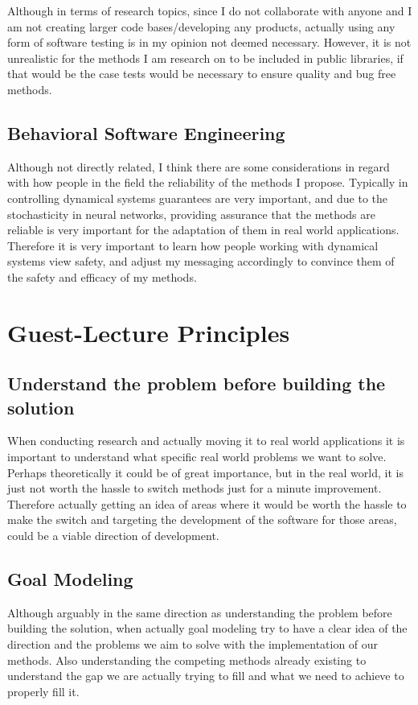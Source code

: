 \documentclass{article}
\begin{document}
Although in terms of research topics, since I do not collaborate with anyone and I am not creating larger code bases/developing any products, actually using any form of software testing is in my opinion not deemed necessary. However, it is not unrealistic for the methods I am research on to be included in public libraries, if that would be the case tests would be necessary to ensure quality and bug free methods.

\subsection{Behavioral Software Engineering}
Although not directly related, I think there are some considerations in regard with how people in the field the reliability of the methods I propose. Typically in controlling dynamical systems guarantees are very important, and due to the stochasticity in neural networks, providing assurance that the methods are reliable is very important for the adaptation of them in real world applications. Therefore it is very important to learn how people working with dynamical systems view safety, and adjust my messaging accordingly to convince them of the safety and efficacy of my methods.

\section{Guest-Lecture Principles}
\subsection{Understand the problem before building the solution}
When conducting research and actually moving it to real world applications it is important to understand what specific real world problems we want to solve. Perhaps theoretically it could be of great importance, but in the real world, it is just not worth the hassle to switch methods just for a minute improvement. Therefore actually getting an idea of areas where it would be worth the hassle to make the switch and targeting the development of the software for those areas, could be a viable direction of development.
\subsection{Goal Modeling}
Although arguably in the same direction as understanding the problem before building the solution, when actually goal modeling try to have a clear idea of the direction and the problems we aim to solve with the implementation of our methods. Also understanding the competing methods already existing to understand the gap we are actually trying to fill and what we need to achieve to properly fill it.
\end{document}
